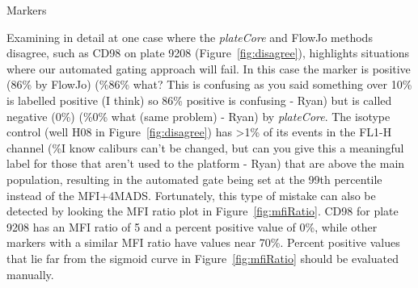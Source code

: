 \documentclass[12pt]{article}
\newcommand{\Rpackage}[1]{{\textit{#1}}}
\begin{document}
Markers 




Examining in detail at one case where the \Rpackage{plateCore} and FlowJo
methods disagree, such as CD98 on plate 9208 (Figure~\ref{fig:disagree}),
highlights situations where our automated gating approach will fail. In this
case the marker is positive (86\% by FlowJo) (\%86\% what? This is confusing as
you said something over 10\% is labelled positive (I think) so 86\% positive is
confusing - Ryan) but is  called negative (0\%) (\%0\% what (same problem) -
Ryan) by \Rpackage{plateCore}. The isotype control (well H08 in
Figure~\ref{fig:disagree}) has >1\% of its events in the FL1-H channel (\%I
know caliburs can't be changed, but can you give this a meaningful label for
those that aren't used to the platform - Ryan) that are above the main
population, resulting in the automated gate being set at the 99th percentile
instead of the MFI+4MADS. Fortunately, this type of mistake can also be
detected by looking the MFI ratio plot in Figure~\ref{fig:mfiRatio}. CD98 for
plate 9208 has an MFI ratio of 5 and a percent positive value of 0\%, while
other markers with a similar MFI ratio have values near 70\%. Percent positive
values that lie far from the sigmoid curve in Figure~\ref{fig:mfiRatio} should
be evaluated manually.
\end{document}
